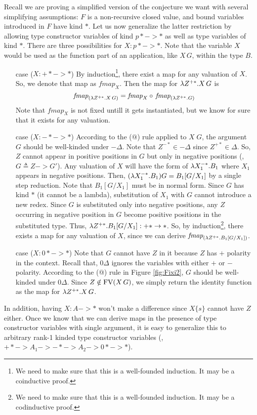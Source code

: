 Recall we are proving a simplified version of the conjecture we want with
several simplifying assumptions: $F$ is a non-recursive closed value, and
bound variables introduced in $F$ have kind $*$. Let us now generalize
the latter restriction by allowing type constructor variables of kind $p* -> *$
as well as type variables of kind $*$. There are three possibilities for
$X:p* -> *$. Note that the variable $X$ would be used as the function part of
an application, like $X\,G$, within the type $B$.
\begin{itemize}
\item[case]($X : +* -> *$)
        By induction\footnote{
                We need to make sure that this is a well-founded induction.
		It may be a coinductive proof.},
        there exist a map for any valuation of $X$.
        So, we denote that map as $\textit{fmap}_{X}$.
        Then the map for $\lambda Z^{+*}.X\,G$ is
        \[ \textit{fmap}_{(\lambda Z^{+*}.X\,G)} =
                \textit{fmap}_{X} \circ\, \textit{fmap}_{(\lambda Z^{+*}.G)} \]
        Note that $\textit{fmap}_{X}$ is not fixed untill it gets
        instantiated, but we know for sure that it exists for any
        valuation.

\item[case]($X : -* -> *$)
        According to the ($@$) rule applied to $X\;G$, the argument $G$ should be well-kinded under $-\Delta$.
        Note that $Z^{-*}\in-\Delta$ since $Z^{+*}\in \Delta$.
        So, $Z$ cannot appear in positive positions in $G$ but only in
        negative positions (\eg, $G \triangleq Z -> G'$).
        Any valuation of $X$ will have the form of $\lambda X_1^{-*}.B_1$
        where $X_1$ appears in negative positions.
        Then, $(\lambda X_1^{-*}.B_1)G = B_1[G/X_1]$ by a single step reduction.
	Note that $B_1[G/X_1]$ must be in normal form. Since $G$ has kind $*$
	(it cannot be a lambda), substitution of $X_1$ with $G$ cannot
	introduce a new redex. Since $G$ is substituted only into
        negative positions, any $Z$ occurring in negative position in $G$
        become positive positions in the substituted type.
	Thus, $\lambda Z^{+*}.B_1[G/X_1] : +* -> *$.
        So, by induction\footnote{
                We need to make sure that this is a well-founded induction.
		It may be a codinductive proof.},
        there exists a map for any valuation of $X$,
        since we can derive $\textit{fmap}_{(\lambda Z^{+*}.B_1[G/X_1])}$.

\item[case]($X : 0* -> *$)
        Note that $G$ cannot have $Z$ in it because $Z$ has $+$ polarity
        in the context. Recall that, $0\Delta$ ignores the variables
        with either $+$ or $-$ polarity. According to the ($@$) rule
        in Figure \ref{fig:Fixi2}, $G$ should be well-kinded under $0\Delta$.
        Since $Z\notin\mathop{\mathrm{FV}}(X\,G)$, we simply return the identity function
        as the map for $\lambda Z^{+*}.X\,G$.
\end{itemize}
In addition, having $X : A -> *$ won't make a difference since $X\{s\}$
cannot have $Z$ either. Once we know that we can derive maps in the presence
of type constructor variables with single argument, it is easy to generalize
this to arbitrary rank-1 kinded type constructor variables
(\eg, $+* -> A_1 -> -* -> A_2 -> 0* -> *$).

